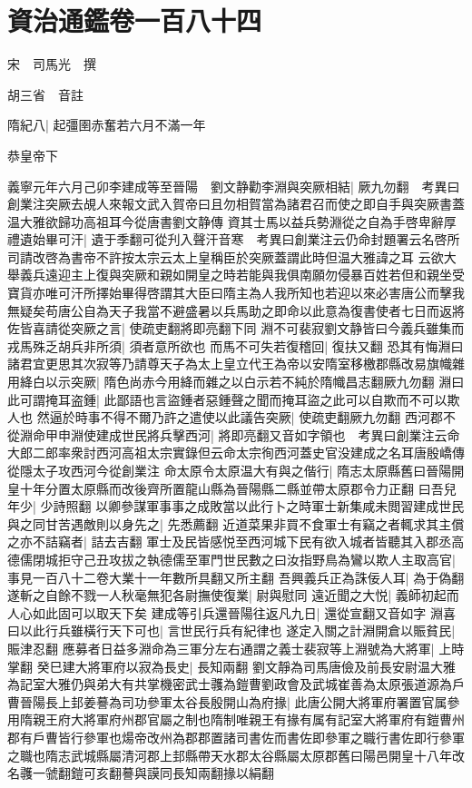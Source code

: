 \section{資治通鑑卷一百八十四}
宋　司馬光　撰

胡三省　音註

隋紀八|{
	起彊圉赤奮若六月不滿一年}


恭皇帝下

義寧元年六月己卯李建成等至晉陽　劉文静勸李淵與突厥相結|{
	厥九勿翻　考異曰創業注突厥去覘人來報文武入賀帝曰且勿相賀當為諸君召而使之即自手與突厥書蓋温大雅欲歸功高祖耳今從唐書劉文静傳}
資其士馬以益兵勢淵從之自為手啓卑辭厚禮遺始畢可汗|{
	遺于季翻可從刋入聲汗音寒　考異曰創業注云仍命封題署云名啓所司請改啓為書帝不許按太宗云太上皇稱臣於突厥蓋謂此時但温大雅諱之耳}
云欲大舉義兵遠迎主上復與突厥和親如開皇之時若能與我俱南願勿侵暴百姓若但和親坐受寶貨亦唯可汗所擇始畢得啓謂其大臣曰隋主為人我所知也若迎以來必害唐公而擊我無疑矣苟唐公自為天子我當不避盛暑以兵馬助之即命以此意為復書使者七日而返將佐皆喜請從突厥之言|{
	使疏吏翻將即亮翻下同}
淵不可裴寂劉文静皆曰今義兵雖集而戎馬殊乏胡兵非所須|{
	須者意所欲也}
而馬不可失若復稽回|{
	復扶又翻}
恐其有悔淵曰諸君宜更思其次寂等乃請尊天子為太上皇立代王為帝以安隋室移檄郡縣改易旗幟雜用絳白以示突厥|{
	隋色尚赤今用絳而雜之以白示若不純於隋幟昌志翻厥九勿翻}
淵曰此可謂掩耳盗鍾|{
	此鄙語也言盜鍾者惡鍾聲之聞而掩耳盜之此可以自欺而不可以欺人也}
然逼於時事不得不爾乃許之遣使以此議告突厥|{
	使疏吏翻厥九勿翻}
西河郡不從淵命甲申淵使建成世民將兵擊西河|{
	將即亮翻又音如字領也　考異曰創業注云命大郎二郎率衆討西河高祖太宗實錄但云命太宗徇西河蓋史官没建成之名耳唐殷嶠傳從隱太子攻西河今從創業注}
命太原令太原温大有與之偕行|{
	隋志太原縣舊曰晉陽開皇十年分置太原縣而改後齊所置龍山縣為晉陽縣二縣並帶太原郡令力正翻}
曰吾兒年少|{
	少詩照翻}
以卿參謀軍事事之成敗當以此行卜之時軍士新集咸未閲習建成世民與之同甘苦遇敵則以身先之|{
	先悉薦翻}
近道菜果非買不食軍士有竊之者輒求其主償之亦不詰竊者|{
	詰去吉翻}
軍士及民皆感悦至西河城下民有欲入城者皆聽其入郡丞高德儒閉城拒守己丑攻拔之執德儒至軍門世民數之曰汝指野鳥為鸞以欺人主取高官|{
	事見一百八十二卷大業十一年數所具翻又所主翻}
吾興義兵正為誅佞人耳|{
	為于偽翻}
遂斬之自餘不戮一人秋毫無犯各尉撫使復業|{
	尉與慰同}
遠近聞之大悦|{
	義師初起而人心如此固可以取天下矣}
建成等引兵還晉陽往返凡九日|{
	還從宣翻又音如字}
淵喜曰以此行兵雖橫行天下可也|{
	言世民行兵有紀律也}
遂定入關之計淵開倉以賑貧民|{
	賑津忍翻}
應募者日益多淵命為三軍分左右通謂之義士裴寂等上淵號為大將軍|{
	上時掌翻}
癸巳建大將軍府以寂為長史|{
	長知兩翻}
劉文靜為司馬唐儉及前長安尉温大雅為記室大雅仍與弟大有共掌機密武士彠為鎧曹劉政會及武城崔善為太原張道源為戶曹晉陽長上邽姜謩為司功參軍太谷長殷開山為府掾|{
	此唐公開大將軍府署置官属參用隋親王府大將軍府州郡官屬之制也隋制唯親王有掾有属有記室大將軍府有鎧曹州郡有戶曹皆行參軍也煬帝改州為郡郡置諸司書佐而書佐即參軍之職行書佐即行參軍之職也隋志武城縣屬清河郡上邽縣帶天水郡太谷縣屬太原郡舊曰陽邑開皇十八年改名彠一虢翻鎧可亥翻謩與謨同長知兩翻掾以絹翻}
